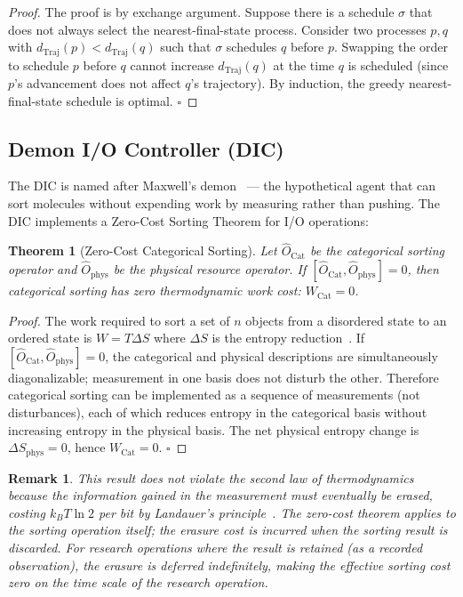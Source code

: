 \documentclass[12pt,twocolumn]{article}
\newtheorem{theorem}{Theorem}[section]
\newtheorem{remark}{Remark}[section]
\DeclareMathOperator{\Cat}{Cat}
\DeclareMathOperator{\Traj}{Traj}
\begin{document}
\begin{proof}
The proof is by exchange argument. Suppose there is a schedule $\sigma$ that does not always select the nearest-final-state process. Consider two processes $p, q$ with $d_{\Traj}(p) < d_{\Traj}(q)$ such that $\sigma$ schedules $q$ before $p$. Swapping the order to schedule $p$ before $q$ cannot increase $d_{\Traj}(q)$ at the time $q$ is scheduled (since $p$'s advancement does not affect $q$'s trajectory). By induction, the greedy nearest-final-state schedule is optimal. $\square$
\end{proof}

\subsection{Demon I/O Controller (DIC)}

The DIC is named after Maxwell's demon~\cite{jaynes1957information} --- the hypothetical agent that can sort molecules without expending work by measuring rather than pushing. The DIC implements a Zero-Cost Sorting Theorem for I/O operations:

\begin{theorem}[Zero-Cost Categorical Sorting]
\label{thm:zero_cost}
Let $\hat{O}_{\Cat}$ be the categorical sorting operator and $\hat{O}_{\text{phys}}$ be the physical resource operator. If $[\hat{O}_{\Cat}, \hat{O}_{\text{phys}}] = 0$, then categorical sorting has zero thermodynamic work cost: $W_{\Cat} = 0$.
\end{theorem}

\begin{proof}
The work required to sort a set of $n$ objects from a disordered state to an ordered state is $W = T \Delta S$ where $\Delta S$ is the entropy reduction~\cite{landauer1961irreversibility}. If $[\hat{O}_{\Cat}, \hat{O}_{\text{phys}}] = 0$, the categorical and physical descriptions are simultaneously diagonalizable; measurement in one basis does not disturb the other. Therefore categorical sorting can be implemented as a sequence of measurements (not disturbances), each of which reduces entropy in the categorical basis without increasing entropy in the physical basis. The net physical entropy change is $\Delta S_{\text{phys}} = 0$, hence $W_{\Cat} = 0$. $\square$
\end{proof}

\begin{remark}
This result does not violate the second law of thermodynamics~\cite{bennett1973logical} because the information gained in the measurement must eventually be erased, costing $k_B T \ln 2$ per bit by Landauer's principle~\cite{landauer1961irreversibility}. The zero-cost theorem applies to the sorting operation itself; the erasure cost is incurred when the sorting result is discarded. For research operations where the result is retained (as a recorded observation), the erasure is deferred indefinitely, making the effective sorting cost zero on the time scale of the research operation.
\end{remark}
\end{document}
